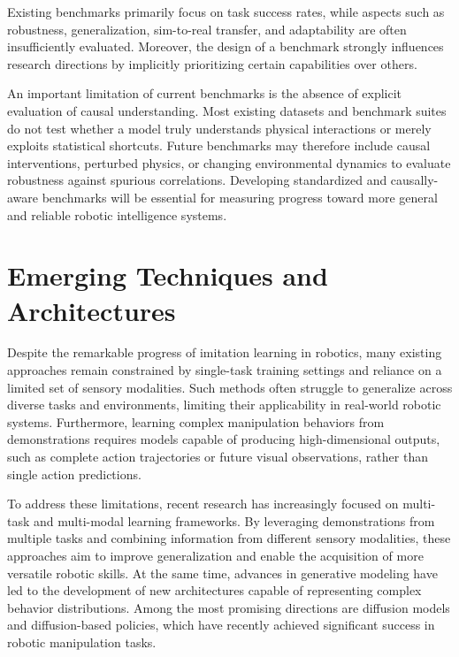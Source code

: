 Existing benchmarks primarily focus on task success rates, while aspects such as robustness, generalization, sim-to-real transfer, and adaptability are often insufficiently evaluated. Moreover, the design of a benchmark strongly influences research directions by implicitly prioritizing certain capabilities over others.

An important limitation of current benchmarks is the absence of explicit evaluation of causal understanding. Most existing datasets and benchmark suites do not test whether a model truly understands physical interactions or merely exploits statistical shortcuts. Future benchmarks may therefore include causal interventions, perturbed physics, or changing environmental dynamics to evaluate robustness against spurious correlations. Developing standardized and causally-aware benchmarks will be essential for measuring progress toward more general and reliable robotic intelligence systems.





\section{Emerging Techniques and Architectures}

Despite the remarkable progress of imitation learning in robotics, many existing approaches remain constrained by single-task training settings and reliance on a limited set of sensory modalities. Such methods often struggle to generalize across diverse tasks and environments, limiting their applicability in real-world robotic systems. Furthermore, learning complex manipulation behaviors from demonstrations requires models capable of producing high-dimensional outputs, such as complete action trajectories or future visual observations, rather than single action predictions.

To address these limitations, recent research has increasingly focused on multi-task and multi-modal learning frameworks. By leveraging demonstrations from multiple tasks and combining information from different sensory modalities, these approaches aim to improve generalization and enable the acquisition of more versatile robotic skills. At the same time, advances in generative modeling have led to the development of new architectures capable of representing complex behavior distributions. Among the most promising directions are diffusion models and diffusion-based policies, which have recently achieved significant success in robotic manipulation tasks.

